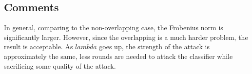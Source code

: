 \documentclass[11pt]{article}
\begin{document}
\subsection*{Comments}
In general, comparing to the non-overlapping case, the Frobenius norm is significantly larger. However, since the overlapping is a much harder problem, the result is acceptable. As $lambda$ goes up, the strength of the attack is approximately the same, less rounds are needed to attack the classifier while sacrificing some quality of the attack.
\end{document}
